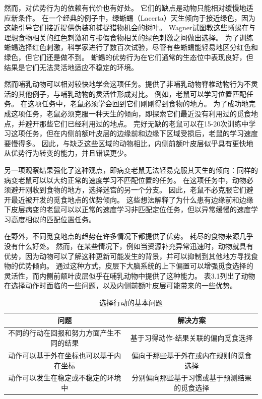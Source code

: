 然而，对优势行为的依赖有代价也有好处。
它们的缺点是动物只能相对缓慢地适应新条件。
在一个经典的例子中，绿蜥蜴（Lacerta）天生倾向于接近绿色，因为这能引导它们接近提供伪装和捕捉猎物机会的树叶。
Wagner\cite{wagner1932farbensinn}试图教这些蜥蜴在与理想食物相关的红色刺激和与掺假食物相关的绿色刺激之间做出选择。
为了训练蜥蜴选择红色刺激，科学家进行了数百次试验，尽管有些蜥蜴能轻易地区分红色和绿色，但它们还是做不到。
蜥蜴的优势行为在它们通常的生态位中表现良好，但结果是它们无法灵活地适应不稳定的环境。\par


然而哺乳动物可以相对较快地学会这项任务。\cite{murray2011can}提供了非哺乳动物脊椎动物行为不灵活的其他例子，与哺乳动物的灵活性形成对比。
例如，老鼠可以学习位置匹配任务。
在这项任务中，老鼠必须学会回到它们刚刚得到食物的地方\cite{marighetto1998effects}。
为了成功地完成这项任务，老鼠必须克服一种天生的倾向，即探索它们最近没有利用过的觅食地点，并避开那些它们已经利用过的地点。
完好无缺的老鼠可以在15-20次训练中学习这项任务，但在内侧前额叶皮层的边缘前和边缘下区域受损后，老鼠的学习速度要慢得多\cite{dias2000effects}。
因此，与缺乏这些区域的动物相比，内侧前额叶皮层似乎具有更快地从优势行为转变的能力，并且错误更少。\par


另一项观察结果强化了这种观点，即病变老鼠无法轻易克服其天生的倾向：同样的病变老鼠可以以大约正常的速度学习不匹配位置的任务\cite{dias2000effects}。
在这项任务中，动物必须避开刚收到食物的地方，选择迷宫的另一个分支。
因此，老鼠不必克服它们避开最近被开发的觅食地点的优势倾向。
这些想法解释了为什么患有边缘前和边缘下皮层病变的老鼠可以以正常的速度学习非匹配定位任务，但以异常缓慢的速度学习高度相似的匹配位置任务。\par


在野外，不同觅食地点的趋势在许多情况下都提供了优势。
耗尽的食物来源几乎没有什么好处。
然而，在某些情况下，例如当资源补充异常迅速时，动物就具有优势，因为动物可以了解这种更新可能发生的背景，并可以抑制到其他地方寻找食物的优势倾向。
通过这种方式，皮层下大脑系统的上下偏置可以增强觅食选择的灵活性，而内侧前额叶皮层似乎在哺乳动物中提供了这种能力。
表3.1列出了动物在选择动作时面临的一些问题，以及内侧前额叶皮层可能带来的一些优势。\par


\begin{table}[htbp]
	\newcommand{\tabincell}[2]{\begin{tabular}{@{}#1@{}}#2\end{tabular}} %
	\centering
	\caption{选择行动的基本问题}
	\renewcommand\arraystretch{1.5}	%
	\begin{tabular}{c c }	 %
		\hline	%
		问题 & 解决方案 \\	
		\hline  %
		不同的行动在回报和努力方面产生不同的结果 & 基于习得动作-结果关联的偏向觅食选择 \\
		\hline
		动作可以基于外在坐标也可以基于内在坐标 & 偏向于那些基于外在或内在规则的觅食选择 \\
		\hline
		动作可以发生在稳定或不稳定的环境中 & 分别偏向那些基于习惯或基于预测结果的觅食选择 \\
		\hline
	\end{tabular}%
\end{table}%



